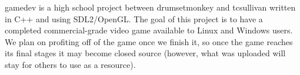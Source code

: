 gamedev is a high school project between drumsetmonkey and tcsullivan written in C++ and using S\+D\+L2/\+Open\+G\+L. The goal of this project is to have a completed commercial-\/grade video game available to Linux and Windows users. We plan on profiting off of the game once we finish it, so once the game reaches its final stages it may become closed source (however, what was uploaded will stay for others to use as a resource). 